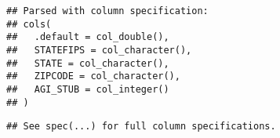 \documentclass[]{article}
\newenvironment{Shaded}{\begin{snugshade}}{\end{snugshade}}
\newcommand{\KeywordTok}[1]{\textcolor[rgb]{0.13,0.29,0.53}{\textbf{#1}}}
\newcommand{\StringTok}[1]{\textcolor[rgb]{0.31,0.60,0.02}{#1}}
\newcommand{\OperatorTok}[1]{\textcolor[rgb]{0.81,0.36,0.00}{\textbf{#1}}}
\newcommand{\NormalTok}[1]{#1}
\begin{document}
\begin{verbatim}
## Parsed with column specification:
## cols(
##   .default = col_double(),
##   STATEFIPS = col_character(),
##   STATE = col_character(),
##   ZIPCODE = col_character(),
##   AGI_STUB = col_integer()
## )
\end{verbatim}

\begin{verbatim}
## See spec(...) for full column specifications.
\end{verbatim}

\begin{Shaded}
\end{Shaded}
\end{document}
